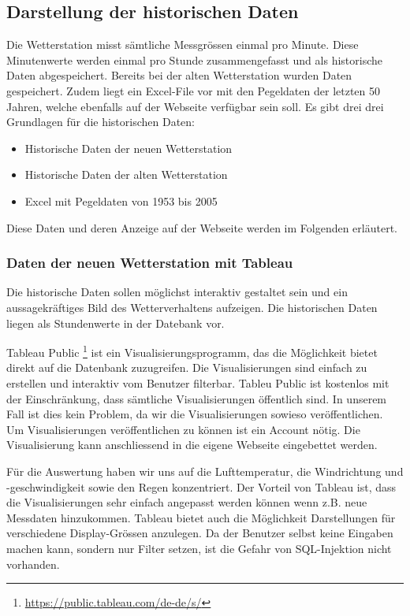 \subsection{Darstellung der historischen Daten}
Die Wetterstation misst sämtliche Messgrössen einmal pro Minute. Diese Minutenwerte werden einmal pro Stunde zusammengefasst und als historische Daten abgespeichert. Bereits bei der alten Wetterstation wurden Daten gespeichert. Zudem liegt ein Excel-File vor mit den Pegeldaten der letzten 50 Jahren, welche ebenfalls auf der Webseite verfügbar sein soll. Es gibt drei drei Grundlagen für die historischen Daten:

\begin{itemize}
\item Historische Daten der neuen Wetterstation
\item Historische Daten der alten Wetterstation
\item Excel mit Pegeldaten von 1953 bis 2005
\end{itemize}

Diese Daten und deren Anzeige auf der Webseite werden im Folgenden erläutert.



\subsubsection{Daten der neuen Wetterstation mit Tableau}
Die historische Daten sollen möglichst interaktiv gestaltet sein und ein aussagekräftiges Bild des Wetterverhaltens aufzeigen. Die historischen Daten liegen als Stundenwerte in der Datebank vor.


Tableau Public \footnote{ \url{https://public.tableau.com/de-de/s/}} ist ein Visualisierungsprogramm, das die Möglichkeit bietet direkt auf die Datenbank zuzugreifen. Die Visualisierungen sind einfach zu erstellen und interaktiv vom Benutzer filterbar.
Tableu Public ist kostenlos mit der Einschränkung, dass sämtliche Visualisierungen öffentlich sind. In unserem Fall ist dies kein Problem, da wir die Visualisierungen sowieso veröffentlichen. Um Visualisierungen veröffentlichen zu können ist ein Account nötig. Die Visualisierung kann anschliessend in die eigene Webseite eingebettet werden.

Für die Auswertung haben wir uns auf die Lufttemperatur, die Windrichtung und -geschwindigkeit sowie den Regen konzentriert.
Der Vorteil von Tableau ist, dass die Visualisierungen sehr einfach angepasst werden können wenn z.B. neue Messdaten hinzukommen. Tableau bietet auch die Möglichkeit Darstellungen für verschiedene Display-Grössen anzulegen. Da der Benutzer selbst keine Eingaben machen kann, sondern nur Filter setzen, ist die Gefahr von SQL-Injektion nicht vorhanden.


